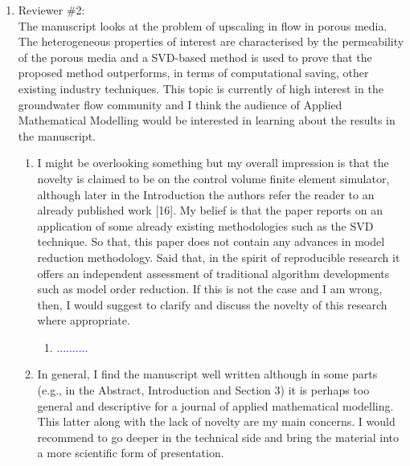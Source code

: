\documentclass[11pt]{letter} %
\newcommand{\blue}{\textcolor{blue}}
\begin{document}
\begin{letter}
{\begin{enumerate}
\begin{enumerate}
\begin{enumerate}
        \end{enumerate}
    \item \label{R_R1_CompEffort} The paper also lacks comparison in computational effort, which is the main objective of such parameterization. For all of these reasons I am rejecting this paper for further publication.
      \begin{enumerate}
      \item \label{R_R1_CompEffort} \blue{..........}
        \end{enumerate}
    \end{enumerate}

\item Reviewer \#2: \\
  The manuscript looks at the problem of upscaling in flow in porous media. The heterogeneous properties of interest are characterised by the permeability of the porous media and a SVD-based method is used to prove that the proposed method outperforms, in terms of computational saving, other existing industry techniques. This topic is currently of high interest in the groundwater flow community and I think the audience of Applied Mathematical Modelling would be interested in learning about the results in the manuscript.
  \begin{enumerate}
  \item \label{R_R2_Novelty} I might be overlooking something but my overall impression is that the novelty is claimed to be on the control volume finite element simulator, although later in the Introduction the authors refer the reader to an already published work [16]. My belief is that the paper reports on an application of some already existing methodologies such as the SVD technique. So that, this paper does not contain any advances in model reduction methodology. Said that, in the spirit of reproducible research it offers an independent assessment of traditional algorithm developments such as model order reduction. If this is not the case and I am wrong, then, I would suggest to clarify and discuss the novelty of this research where appropriate.
    \begin{enumerate}
      \item \label{R_R2_Novelty_1} \blue{..........}
        \end{enumerate}
\item \label{R_R2_TooDesc} In general, I find the manuscript well written although in some parts (e.g., in the Abstract, Introduction and Section 3) it is perhaps too general and descriptive for a journal of applied mathematical modelling. This latter along with the lack of novelty are my main concerns. I would recommend to go deeper in the technical side and bring the material into a more scientific form of presentation.

\end{enumerate}
\end{enumerate}}
\end{letter}
\end{document}
